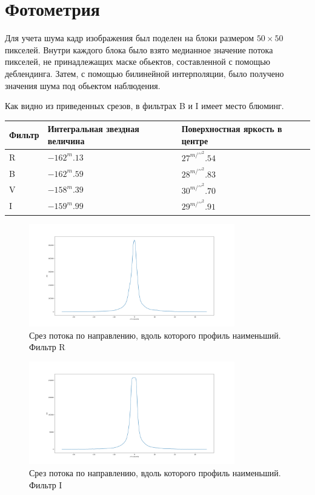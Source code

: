 \documentclass [12pt, a4paper] {article}
\theoremstyle{definition}
\begin{document}
	\section{Фотометрия}
	Для учета шума кадр изображения был поделен на блоки размером $50\times50$ пикселей. Внутри каждого блока было взято медианное значение потока пикселей, не принадлежащих маске обьектов, составленной с помощью деблендинга. Затем, с помощью билинейной интерполяции, было получено значения шума под обьектом наблюдения.
	\par Как видно из приведенных срезов, в фильтрах B и I имеет место блюминг.
	\par
	\begin{tabular}{p{1.5cm}|p{5cm}|p{5cm}}
	\hline
	Фильтр & Интегральная звездная величина & Поверхностная яркость в центре \\
	\hline\hline
	R & $-162^{m}.13$ & $27^{m/{\prime \prime}^2}.54$\\
	\hline
	B &$-162^{m}.59$ & $28^{m/{\prime \prime}^2}.83$\\
	\hline
	V &$-158^{m}.39$ & $30^{m/{\prime \prime}^2}.70$\\
	\hline
	I &$-159^{m}.99$ & $29^{m/{\prime \prime}^2}.91$\\
	\end{tabular}
\begin{figure}
		\centering
			\includegraphics[width = 0.8\textwidth]{R_slice_min.png}
			\caption{Срез потока по направлению, вдоль которого профиль наименьший. Фильтр R}
		\end{figure}
		\begin{figure}
		\centering
			\includegraphics[width = 0.8\textwidth]{I_slice_min.png}
						\caption{Срез потока по направлению, вдоль которого профиль наименьший. Фильтр I}
		\end{figure}
\end{document}
